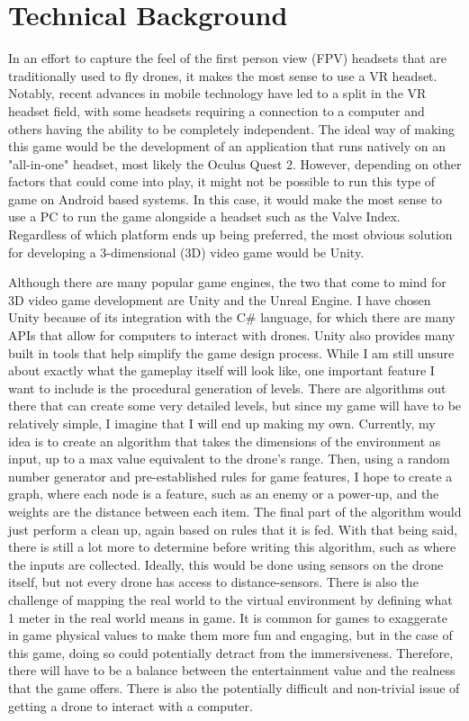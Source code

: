 \documentclass[10pt,twocolumn]{article}
\begin{document}
\section{Technical Background}
In an effort to capture the feel of the first person view (FPV) headsets that are traditionally used to fly drones, it makes the most sense to use a VR headset. Notably, recent advances in mobile technology have led to a split in the VR headset field, with some headsets requiring a connection to a computer and others having the ability to be completely independent. The ideal way of making this game would be the development of an application that runs natively on an "all-in-one" headset, most likely the Oculus Quest 2. However, depending on other factors that could come into play, it might not be possible to run this type of game on Android based systems. In this case, it would make the most sense to use a PC to run the game alongside a headset such as the Valve Index. Regardless of which platform ends up being preferred, the most obvious solution for developing a 3-dimensional (3D) video game would be Unity.

Although there are many popular game engines, the two that come to mind for 3D video game development are Unity and the Unreal Engine. I have chosen Unity because of its integration with the C\# language, for which there are many APIs that allow for computers to interact with drones. Unity also provides many built in tools that help simplify the game design process. While I am still unsure about exactly what the gameplay itself will look like, one important feature I want to include is the procedural generation of levels. There are algorithms out there that can create some very detailed levels, but since my game will have to be relatively simple, I imagine that I will end up making my own. Currently, my idea is to create an algorithm that takes the dimensions of the environment as input, up to a max value equivalent to the drone's range. Then, using a random number generator and pre-established rules for game features, I hope to create a graph, where each node is a feature, such as an enemy or a power-up, and the weights are the distance between each item. The final part of the algorithm would just perform a clean up, again based on rules that it is fed. With that being said, there is still a lot more to determine before writing this algorithm, such as where the inputs are collected. Ideally, this would be done using sensors on the drone itself, but not every drone has access to distance-sensors. There is also the challenge of mapping the real world to the virtual environment by defining what 1 meter in the real world means in game. It is common for games to exaggerate in game physical values to make them more fun and engaging, but in the case of this game, doing so could potentially detract from the immersiveness. Therefore, there will have to be a balance between the entertainment value and the realness that the game offers. There is also the potentially difficult and non-trivial issue of getting a drone to interact with a computer.
\end{document}
